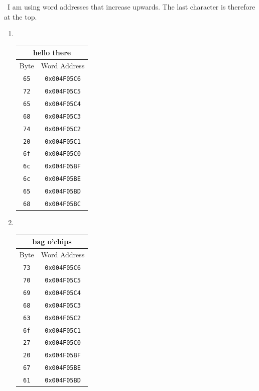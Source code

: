 \documentclass[12pt]{article}
\newenvironment{sol}[1][Solution]{\begin{trivlist}
		\item[\hskip \labelsep {\bfseries #1:}]}{\end{trivlist}}
\begin{document}
\begin{sol}
	\
	I am using  word addresses that increase upwards. The last character is therefore at the top.
	\begin{enumerate}[label=(\alph*)]
		\item 
		\
		\begin{center}
			\begin{tabular}{cc}
			\multicolumn{2}{c}{hello there}\\
			\hline
			Byte & Word Address\\
			\hline
			\texttt{65} & \texttt{0x004F05C6}\\
			\texttt{72} & \texttt{0x004F05C5}\\
			\texttt{65} & \texttt{0x004F05C4}\\
			\texttt{68} & \texttt{0x004F05C3}\\
			\texttt{74} & \texttt{0x004F05C2}\\
			\texttt{20} & \texttt{0x004F05C1}\\
			\texttt{6f}	& \texttt{0x004F05C0}\\
			\texttt{6c} & \texttt{0x004F05BF}\\
			\texttt{6c} & \texttt{0x004F05BE}\\
			\texttt{65} & \texttt{0x004F05BD}\\
			\texttt{68}	& \texttt{0x004F05BC}
			\end{tabular}
		\end{center}
		\item
		\
		\begin{center}
			\begin{tabular}{cc}
				\multicolumn{2}{c}{bag o'chips}\\
				\hline
				Byte & Word Address\\
				\hline
				\texttt{73} & \texttt{0x004F05C6}\\
				\texttt{70} & \texttt{0x004F05C5}\\
				\texttt{69} & \texttt{0x004F05C4} \\
				\texttt{68} & \texttt{0x004F05C3}\\
				\texttt{63} & \texttt{0x004F05C2}\\
				\texttt{6f} & \texttt{0x004F05C1}\\
				\texttt{27}	& \texttt{0x004F05C0}\\
				\texttt{20} & \texttt{0x004F05BF}\\
				\texttt{67} & \texttt{0x004F05BE}\\
				\texttt{61} & \texttt{0x004F05BD}\\

\end{tabular}
\end{center}
\end{enumerate}
\end{sol}
\end{document}
